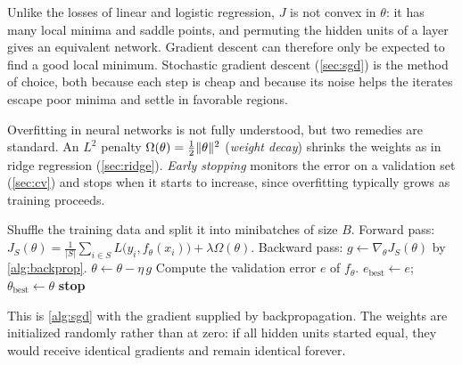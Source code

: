 Unlike the losses of linear and logistic regression, $J$ is not convex in $\theta$: it has many local minima and saddle points, and permuting the hidden units of a layer gives an equivalent network. Gradient descent can therefore only be expected to find a good local minimum. Stochastic gradient descent (\cref{sec:sgd}) is the method of choice, both because each step is cheap and because its noise helps the iterates escape poor minima and settle in favorable regions.

Overfitting in neural networks is not fully understood, but two remedies are standard. An $L^2$ penalty $\Omega(\theta)=\frac12\lVert \theta\rVert^2$ (\emph{weight decay}) shrinks the weights as in ridge regression (\cref{sec:ridge}). \emph{Early stopping} monitors the error on a validation set (\cref{sec:cv}) and stops when it starts to increase, since overfitting typically grows as training proceeds.

\begin{algorithm}[H]
\caption{Training a Neural Network with Minibatch SGD and Early Stopping}\label{alg:nn-training}
\begin{algorithmic}[1]
  \State Shuffle the training data and split it into minibatches of size $B$.
    \State Forward pass: $J_S(\theta)=\frac1{|S|}\sum_{i\in S}L\big(y_i,f_\theta(x_i)\big)+\lambda \Omega(\theta)$.
    \State Backward pass: $g\gets\nabla_\theta J_S(\theta)$ by \cref{alg:backprop}.
    \State $\theta\gets\theta-\eta\,g$ 
  \EndFor
  \State Compute the validation error $e$ of $f_\theta$.
    \State $e_{\mathrm{best}}\gets e$; $\theta_{\mathrm{best}}\gets\theta$
  \EndIf
    \State \textbf{stop} 
  \EndIf
\EndFor
{}
\end{algorithmic}
\end{algorithm}

This is \cref{alg:sgd} with the gradient supplied by backpropagation. The weights are initialized randomly rather than at zero: if all hidden units started equal, they would receive identical gradients and remain identical forever.

